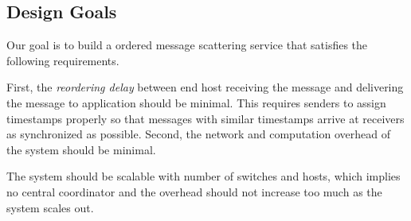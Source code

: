 

\iffalse
\subsection{Design Goals}
\label{sec:goals}

Our goal is to build a ordered message scattering service that satisfies the following requirements.


First, the \textit{reordering delay} between end host receiving the message and delivering the message to application should be minimal.
This requires senders to assign timestamps properly so that messages with similar timestamps arrive at receivers as synchronized as possible.
Second, the network and computation overhead of the system should be minimal.

The system should be scalable with number of switches and hosts, which implies no central coordinator and the overhead should not increase too much as the system scales out.





